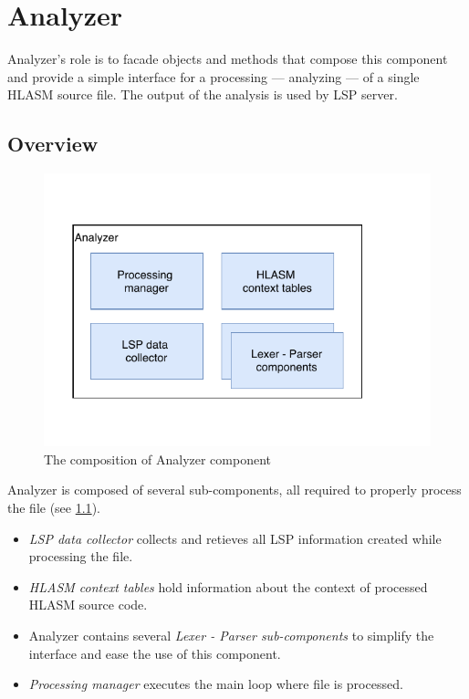 \chapter {Analyzer}

Analyzer's role is to facade objects and methods that compose this component and provide a simple interface for a processing --- analyzing --- of a single HLASM source file. The output of the analysis is used by LSP server.

\section{Overview}

\begin{figure}
	\centering
	\includegraphics[width=\textwidth / 2]{img/analyzer_arch}
	\caption{The composition of Analyzer component}
	\label{fig06:analyzer}
\end{figure}

Analyzer is composed of several sub-components, all required to properly process the file (see \cref{fig06:analyzer}). 
\begin{itemize}
	\item \emph{LSP data collector} collects and retieves all LSP information created while processing the file.
	\item \emph{HLASM context tables} hold information about the context of processed HLASM source code.
	\item Analyzer contains several \emph{Lexer - Parser sub-components} to simplify the interface and ease the use of this component.
	\item \emph{Processing manager} executes the main loop where file is processed.
\end{itemize}

